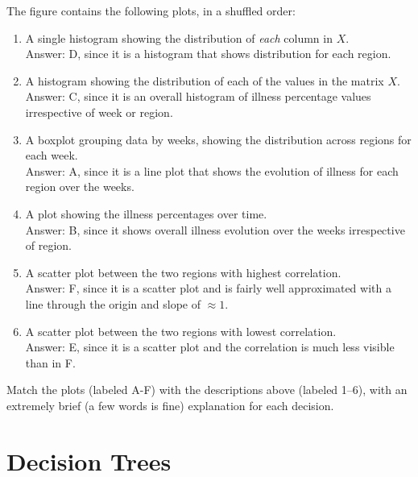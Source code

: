 \documentclass{article}
\newcommand{\ans}[1]{\green{Answer: #1}}
\newcommand{\blue}[1]{{\color{blue}#1}}
\newcommand{\green}[1]{{\color{green}#1}}
\begin{document}
    The figure contains the following plots, in a shuffled order:
    \begin{enumerate}
        \item A single histogram showing the distribution of \emph{each} column in $X$.\\
            \ans{D, since it is a histogram that shows distribution for each region.}
        \item A histogram showing the distribution of each of the values in the matrix $X$.\\
            \ans{C, since it is an overall histogram of illness percentage values irrespective of week or region.}
        \item A boxplot grouping data by weeks, showing the distribution across regions for each week.\\
            \ans{A, since it is a line plot that shows the evolution of illness for each region over the weeks.}
        \item A plot showing the illness percentages over time.\\
            \ans{B, since it shows overall illness evolution over the weeks irrespective of region.}
        \item A scatter plot between the two regions with highest correlation.\\
            \ans{F, since it is a scatter plot and is fairly well approximated with a line through the origin and slope of $\approx 1$.}
        \item A scatter plot between the two regions with lowest correlation.\\
            \ans{E, since it is a scatter plot and the correlation is much less visible than in F.}
    \end{enumerate}

    \blue{Match the plots (labeled A-F) with the descriptions above (labeled 1--6), with an extremely brief (a few words is fine) explanation for each decision.}
    
    \section{Decision Trees}
\end{document}
